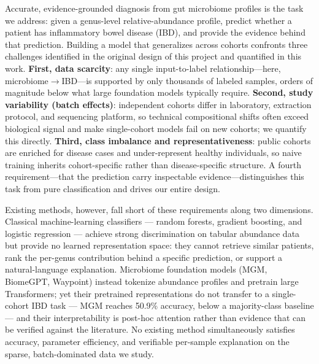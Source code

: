 \documentclass[11pt,a4paper]{article}
\begin{document}
Accurate, evidence-grounded diagnosis from gut microbiome profiles is the task we address: given a genus-level relative-abundance profile, predict whether a patient has inflammatory bowel disease (IBD), and provide the evidence behind that prediction. Building a model that generalizes across cohorts confronts three challenges identified in the original design of this project and quantified in this work. \textbf{First, data scarcity}: any single input-to-label relationship---here, microbiome$\rightarrow$IBD---is supported by only thousands of labeled samples, orders of magnitude below what large foundation models typically require. \textbf{Second, study variability (batch effects)}: independent cohorts differ in laboratory, extraction protocol, and sequencing platform, so technical compositional shifts often exceed biological signal and make single-cohort models fail on new cohorts; we quantify this directly. \textbf{Third, class imbalance and representativeness}: public cohorts are enriched for disease cases and under-represent healthy individuals, so naive training inherits cohort-specific rather than disease-specific structure. A fourth requirement---that the prediction carry inspectable evidence---distinguishes this task from pure classification and drives our entire design.

Existing methods, however, fall short of these requirements along two dimensions. Classical machine-learning classifiers --- random forests, gradient boosting, and logistic regression --- achieve strong discrimination on tabular abundance data but provide no learned representation space: they cannot retrieve similar patients, rank the per-genus contribution behind a specific prediction, or support a natural-language explanation. Microbiome foundation models (MGM, BiomeGPT, Waypoint) instead tokenize abundance profiles and pretrain large Transformers; yet their pretrained representations do not transfer to a single-cohort IBD task --- MGM reaches 50.9\% accuracy, below a majority-class baseline --- and their interpretability is post-hoc attention rather than evidence that can be verified against the literature. No existing method simultaneously satisfies accuracy, parameter efficiency, and verifiable per-sample explanation on the sparse, batch-dominated data we study.
\end{document}

